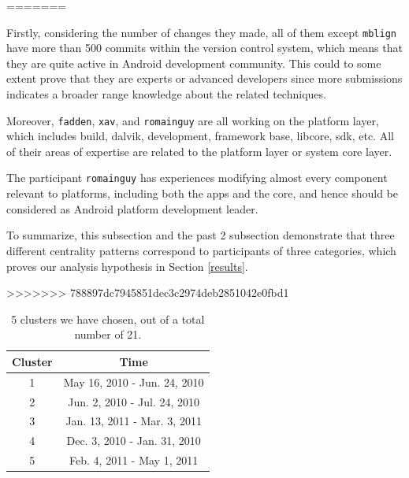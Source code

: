 \documentclass[conference]{IEEEtran}
\begin{document}
=======


Firstly, considering the number of changes they made, all of them
except \texttt{mblign} have more than 500 commits within the
version control system,
which means that they are quite active in Android
development community. This could to some extent prove that they are
experts or advanced developers since more submissions indicates a
 broader range knowledge about the related techniques.


Moreover, \texttt{fadden}, \texttt{xav}, and \texttt{romainguy} are
all working on the platform layer,
which includes build, dalvik, development, framework base, libcore,
sdk, etc. All of their areas of expertise are related to the platform layer or
system core layer.

The participant \texttt{romainguy} has experiences modifying almost every
component relevant to platforms, including both the apps and the core, and
hence should be considered as Android platform development leader.


To summarize, this subsection and the past 2 subsection demonstrate
that three different centrality patterns correspond to
participants of three categories, which proves our analysis hypothesis
in Section \ref{results}.

>>>>>>> 788897dc7945851dec3c2974deb2851042e0fbd1

\begin{table}[!t]
\centering
\caption{5 clusters we have chosen, out of a total number of 21.}
\begin{tabular}{|c|c|}
\hline
Cluster & Time  \\
\hline
1 & May 16, 2010 - Jun. 24, 2010 \\
\hline
2 & Jun. 2, 2010 - Jul. 24, 2010  \\
\hline
3 & Jan. 13, 2011 - Mar. 3, 2011 \\
\hline
4 & Dec. 3, 2010 - Jan. 31, 2010 \\
\hline
5 & Feb. 4, 2011 - May 1, 2011 \\
\hline
\end{tabular}
\label{cluster_list}
\end{table}
\end{document}
